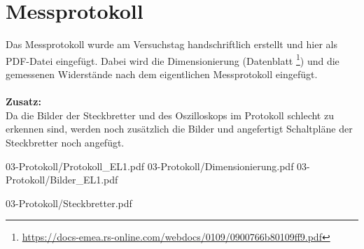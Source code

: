 

\def\skalierung{0.65}

\chapter{Messprotokoll}
\label{chap:protokoll}

Das Messprotokoll wurde am Versuchstag handschriftlich erstellt und hier als
PDF-Datei eingefügt. Dabei wird die Dimensionierung (Datenblatt \footnote{\url{https://docs-emea.rs-online.com/webdocs/0109/0900766b80109ff9.pdf}}) und die gemessenen Widerstände nach dem eigentlichen Messprotokoll eingefügt.\\\\
\textbf{Zusatz:}\\
Da die Bilder der Steckbretter und des Oszilloskops im Protokoll schlecht zu erkennen sind, werden noch zusätzlich die Bilder und angefertigt Schaltpläne der Steckbretter noch angefügt.

%

{03-Protokoll/Protokoll_EL1.pdf}
           {03-Protokoll/Dimensionierung.pdf}
           {03-Protokoll/Bilder_EL1.pdf}

{03-Protokoll/Steckbretter.pdf}

